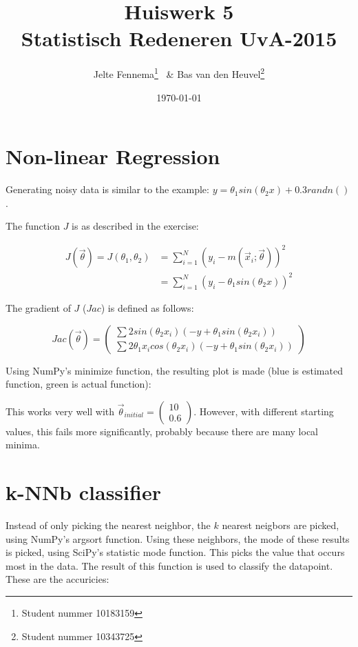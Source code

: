 \documentclass{article}
\title{Huiswerk 5\\ \large{Statistisch Redeneren UvA-2015}}
\author{Jelte Fennema\thanks{Student nummer 10183159} ~\& Bas van den
Heuvel\thanks{Student nummer 10343725}}
\date{\today}
\begin{document}
\maketitle

\section{Non-linear Regression}
Generating noisy data is similar to the example: $y = \theta_1 sin(\theta_2 x) +
0.3 randn()$.

The function $J$ is as described in the exercise:

\begin{align*}
    J(\vec \theta) = J(\theta_1, \theta_2) &= \sum_{i=1}^N (y_i - m(\vec x_i; \vec
    \theta))^2 \\
    &= \sum_{i=1}^N (y_i - \theta_1 sin(\theta_2 x))^2
\end{align*}

The gradient of $J$ ($Jac$) is defined as follows:

$$ Jac(\vec \theta) = \left(\begin{matrix}\sum 2 sin(\theta_2 x_i) (-y +
\theta_1 sin(\theta_2 x_i)) \\ \sum 2 \theta_1 x_i cos(\theta_2
x_i) (-y + \theta_1 sin(\theta_2 x_i)) \end{matrix} \right) $$

Using NumPy's minimize function, the resulting plot is made (blue is estimated
function, green is actual function):



This works very well with $\vec \theta_{initial} = \left(\begin{matrix}10 \\
0.6\end{matrix}\right)$. However, with different starting values, this fails
more significantly, probably because there are many local minima.

\section{k-NNb classifier}

Instead of only picking the nearest neighbor, the $k$ nearest neigbors are
picked, using NumPy's argsort function. Using these neighbors, the mode of these
results is picked, using SciPy's statistic mode function. This picks the value
that occurs most in the data. The result of this function is used to classify
the datapoint. These are the accuricies:
\end{document}
